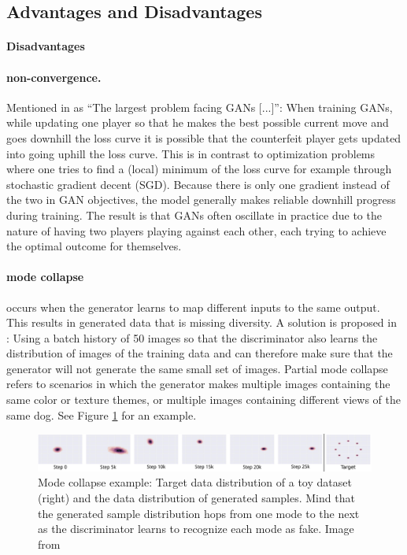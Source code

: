 \subsection{Advantages and Disadvantages}
\paragraph{Disadvantages}
\paragraph{non-convergence.} Mentioned in \cite{DBLP:journals/corr/Goodfellow17} as ``The largest problem facing GANs [...]'': When training GANs, while updating one player so that he makes the best possible current move and goes downhill the loss curve it is possible that the counterfeit player gets updated into going uphill the loss curve. This is in contrast to optimization problems where one tries to find a (local) minimum of the loss curve for example through stochastic gradient decent (SGD). Because there is only one gradient instead of the two in GAN objectives, the model generally makes reliable downhill progress during training. The result is that GANs often oscillate in practice due to the nature of having two players playing against each other, each trying to achieve the optimal outcome for themselves. 

\paragraph{mode collapse} occurs when the generator learns to map different inputs to the same output. This results in generated data that is missing diversity. A solution is proposed in \cite{DBLP:journals/corr/ZhuPIE17}: Using a batch history of 50 images so that the discriminator also learns the distribution of images of the training data and can therefore make sure that the generator will not generate the same small set of images. Partial mode collapse refers to scenarios in which the generator makes multiple images containing the same color or texture themes, or multiple images containing different views of the same dog. See Figure \ref{fig:mode_collapse} for an example.

\begin{figure}
	\centering
	\includegraphics[width=\textwidth]{images/metz_et_al_mode_collapse.png}
	\caption{Mode collapse example: Target data distribution of a toy dataset (right) and the data distribution of generated samples. Mind that the generated sample distribution hops from one mode to the next as the discriminator learns to recognize each mode as fake. Image from \cite{DBLP:journals/corr/MetzPPS16}}
	\label{fig:mode_collapse}
\end{figure}

